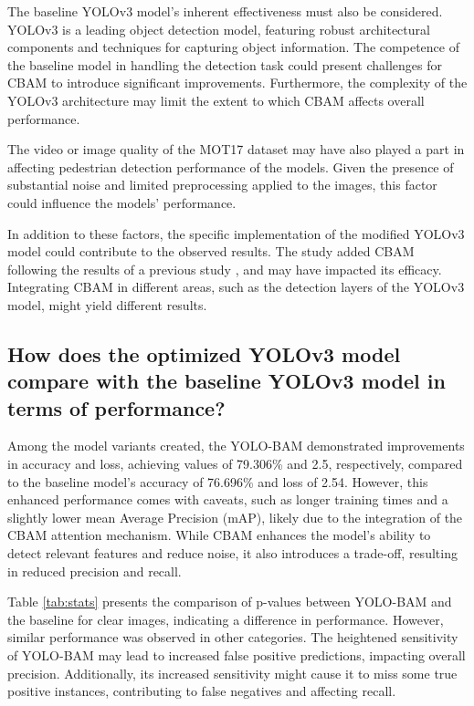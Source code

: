 The baseline YOLOv3 model's inherent effectiveness must also be considered. YOLOv3 is a leading object detection model, featuring robust architectural components and techniques for capturing object information. The competence of the baseline model in handling the detection task could present challenges for CBAM to introduce significant improvements. Furthermore, the complexity of the YOLOv3 architecture may limit the extent to which CBAM affects overall performance.

The video or image quality of the MOT17 dataset may have also played a part in affecting pedestrian detection performance of the models. Given the presence of substantial noise and limited preprocessing applied to the images, this factor could influence the models' performance.

In addition to these factors, the specific implementation of the modified YOLOv3 model could contribute to the observed results. The study added CBAM following the results of a previous study \cite{chakarDepthwiseSeparableConvolutions2020}, and may have impacted its efficacy. Integrating CBAM in different areas, such as the detection layers of the YOLOv3 model, might yield different results.

\subsection{How does the optimized YOLOv3 model compare with the baseline YOLOv3 model in terms of performance?}
Among the model variants created, the YOLO-BAM demonstrated improvements in accuracy and loss, achieving values of 79.306\% and 2.5, respectively, compared to the baseline model's accuracy of 76.696\% and loss of 2.54. However, this enhanced performance comes with caveats, such as longer training times and a slightly lower mean Average Precision (mAP), likely due to the integration of the CBAM attention mechanism. While CBAM enhances the model's ability to detect relevant features and reduce noise, it also introduces a trade-off, resulting in reduced precision and recall.

Table \ref{tab:stats} presents the comparison of p-values between YOLO-BAM and the baseline for clear images, indicating a difference in performance. However, similar performance was observed in other categories. The heightened sensitivity of YOLO-BAM may lead to increased false positive predictions, impacting overall precision. Additionally, its increased sensitivity might cause it to miss some true positive instances, contributing to false negatives and affecting recall.

